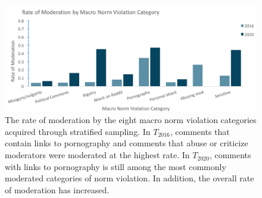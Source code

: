 \begin{figure}[tb]
  \centering
  \includegraphics[width=1\textwidth]{content_minor_revision__Apr2022/images/ef_MODERATION.png}
  \caption{The rate of moderation by the eight macro norm violation categories acquired through stratified sampling. In $T_{2016}$, comments that contain links to pornography and comments that abuse or criticize moderators were moderated at the highest rate. In $T_{2020}$, comments with links to pornography is still among the most commonly moderated categories of norm violation. In addition, the overall rate of moderation has increased.  }
\end{figure}

